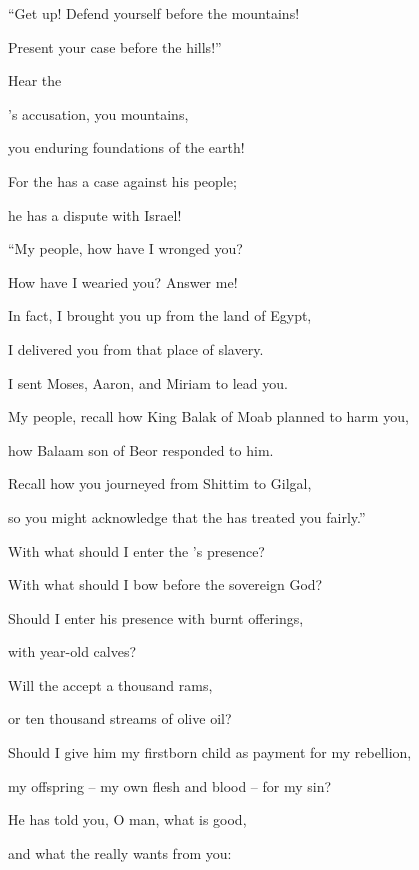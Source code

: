 {\par }{\Q “Get
up! Defend
yourself
before the mountains!

\par }{\Q Present your case
before the hills!”
\par }{\Q {}Hear
the

{}’s
accusation,
you mountains,
\par }{\Q you enduring
foundations
of the earth!
\par }{\Q For
the
{}
has a case
against
his people;
\par }{\Q he has a dispute
with
Israel!
\par }{\Q {}“My people,
how
have I wronged
you?

\par }{\Q How
have I wearied
you? Answer me!
\par }{\Q {}In fact,
I brought you up
from the land
of Egypt,
\par }{\Q I delivered
you from that place of slavery.
\par }{\Q I sent
Moses,
Aaron,
and Miriam to lead you.
\par }{\Q {}My people,
recall
how
King
Balak
of Moab
planned
to harm you,

\par }{\Q how
Balaam
son
of Beor
responded
to him.
\par }{\Q Recall how you journeyed from
Shittim
to
Gilgal,
\par }{\Q so you might
acknowledge
that the
{}
has treated you fairly.”
\par }{\Q {}With what
should I enter
the
{}’s
presence?
\par }{\Q With what should I bow
before the sovereign
God?

\par }{\Q Should I enter
his presence with burnt offerings,
\par }{\Q with year-old
calves?
\par }{\Q {}Will the
{}
accept
a thousand
rams,
\par }{\Q or ten thousand
streams
of olive oil?
\par }{\Q Should I give
him my firstborn child
as payment
for my rebellion,
\par }{\Q my offspring
– my own flesh and blood
– for my sin?
\par }{\Q {}He has told
you, O man,
what
is good,
\par }{\Q and what
the {}
really wants
from
you:

}
